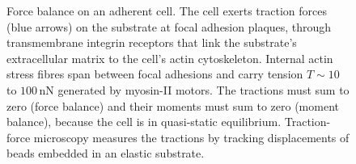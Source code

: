 \begin{figure}[htbp]
\caption{Force balance on an adherent cell. The cell exerts traction
forces (blue arrows) on the substrate at focal adhesion plaques,
through transmembrane integrin receptors that link the substrate's
extracellular matrix to the cell's actin cytoskeleton. Internal actin
stress fibres span between focal adhesions and carry tension
$T \sim 10$ to $100\,\text{nN}$ generated by myosin-II motors. The
tractions must sum to zero (force balance) and their moments must
sum to zero (moment balance), because the cell is in quasi-static
equilibrium. Traction-force microscopy measures the tractions by
tracking displacements of beads embedded in an elastic substrate.}
\label{fig:vol06ch06:cell-force}
\end{figure}
